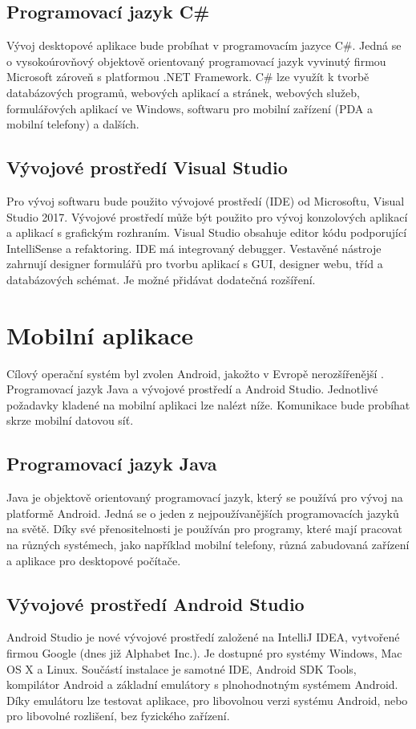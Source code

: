 \documentclass[FM,DP]{tulthesis}  %
\begin{document}
\subsection{Programovací jazyk C\#}
Vývoj desktopové aplikace bude probíhat v programovacím jazyce C\#. Jedná se o vysokoúrovňový objektově orientovaný programovací jazyk vyvinutý firmou Microsoft zároveň s platformou .NET Framework. C\# lze využít k tvorbě databázových programů, webových aplikací a stránek, webových služeb, formulářových aplikací ve Windows, softwaru pro mobilní zařízení (PDA a mobilní telefony) a dalších.

\subsection{Vývojové prostředí Visual Studio}
Pro vývoj softwaru bude použito vývojové prostředí (IDE) od Microsoftu, Visual Studio 2017. Vývojové prostředí může být použito pro vývoj konzolových aplikací a aplikací s grafickým rozhraním. Visual Studio obsahuje editor kódu podporující IntelliSense a refaktoring. IDE má integrovaný debugger. Vestavěné nástroje zahrnují designer formulářů pro tvorbu aplikací s GUI, designer webu, tříd a databázových schémat. Je možné přidávat dodatečná rozšíření.

\section{Mobilní aplikace}
Cílový operační systém byl zvolen Android, jakožto v Evropě nerozšířenější \cite{MobileMarketShare}. Programovací jazyk Java a vývojové prostředí a Android Studio. Jednotlivé požadavky kladené na mobilní aplikaci lze nalézt níže. Komunikace bude probíhat skrze mobilní datovou síť.

\subsection{Programovací jazyk Java}
Java je objektově orientovaný programovací jazyk, který se používá pro vývoj na platformě Android. Jedná se o jeden z nejpoužívanějších programovacích jazyků na světě. Díky své přenositelnosti je používán pro programy, které mají pracovat na různých systémech, jako například mobilní telefony, různá zabudovaná zařízení a aplikace pro desktopové počítače.

\subsection{Vývojové prostředí Android Studio}
Android Studio je nové vývojové prostředí založené na IntelliJ IDEA, vytvořené firmou Google (dnes již Alphabet Inc.). Je dostupné pro systémy Windows, Mac OS X a Linux. Součástí instalace je samotné IDE, Android SDK Tools, kompilátor Android a základní emulátory s plnohodnotným systémem Android. Díky emulátoru lze testovat aplikace, pro libovolnou verzi systému Android, nebo pro libovolné rozlišení, bez fyzického zařízení.
\end{document}
